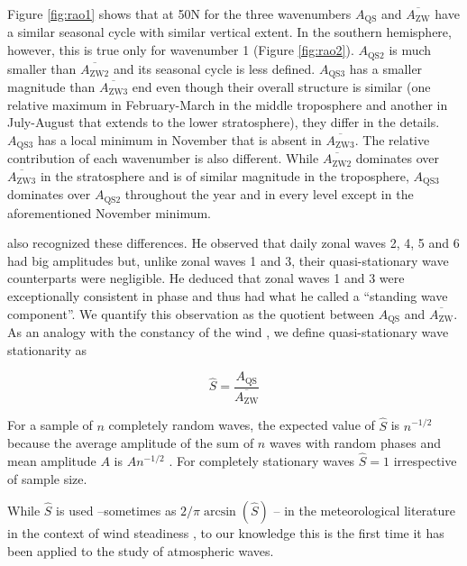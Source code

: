 \documentclass[draft,linenumbers]{agujournal2018}
\begin{document}
Figure \ref{fig:rao1} shows that at 50\degree N for the three
wavenumbers \(A_\mathrm{QS}\) and \(\overline{A_\mathrm{ZW}}\) have a
similar seasonal cycle with similar vertical extent. In the southern
hemisphere, however, this is true only for wavenumber 1 (Figure
\ref{fig:rao2}). \(A_\mathrm{QS2}\) is much smaller than
\(\overline{A_\mathrm{ZW2}}\) and its seasonal cycle is less defined.
\(A_\mathrm{QS3}\) has a smaller magnitude than
\(\overline{A_\mathrm{ZW3}}\) end even though their overall structure is
similar (one relative maximum in February-March in the middle
troposphere and another in July-August that extends to the lower
stratosphere), they differ in the details. \(A_\mathrm{QS3}\) has a
local minimum in November that is absent in
\(\overline{A_\mathrm{ZW3}}\). The relative contribution of each
wavenumber is also different. While \(\overline{A_\mathrm{ZW2}}\)
dominates over \(\overline{A_\mathrm{ZW3}}\) in the stratosphere and is
of similar magnitude in the troposphere, \(A_\mathrm{QS3}\) dominates
over \(A_\mathrm{QS2}\) throughout the year and in every level except in
the aforementioned November minimum.

\citet{Loon1972} also recognized these differences. He observed that
daily zonal waves 2, 4, 5 and 6 had big amplitudes but, unlike zonal
waves 1 and 3, their quasi-stationary wave counterparts were negligible.
He deduced that zonal waves 1 and 3 were exceptionally consistent in
phase and thus had what he called a ``standing wave component''. We
quantify this observation as the quotient between \(A_\mathrm{QS}\) and
\(\overline{A_\mathrm{ZW}}\). As an analogy with the constancy of the
wind \citep{Singer1967}, we define quasi-stationary wave stationarity as

\begin{linenomath*}
\begin{equation}\label{eq:S}
\hat{S} = \frac{A_\mathrm{QS}}{\overline{A_\mathrm{ZW}}}
\end{equation}
\end{linenomath*}

For a sample of \(n\) completely random waves, the expected value of
\(\hat{S}\) is \(n^{-1/2}\) because the average amplitude of the sum of
\(n\) waves with random phases and mean amplitude \(A\) is \(An^{-1/2}\)
\citep{Pain2005}. For completely stationary waves \(\hat{S} = 1\)
irrespective of sample size.

While \(\hat{S}\) is used --sometimes as
\(2/\pi\arcsin \left (\hat{S} \right )\) \citep{Singer1967}-- in the
meteorological literature in the context of wind steadiness
\citep[e.g][]{Hiscox2010}, to our knowledge this is the first time it
has been applied to the study of atmospheric waves.
\end{document}

